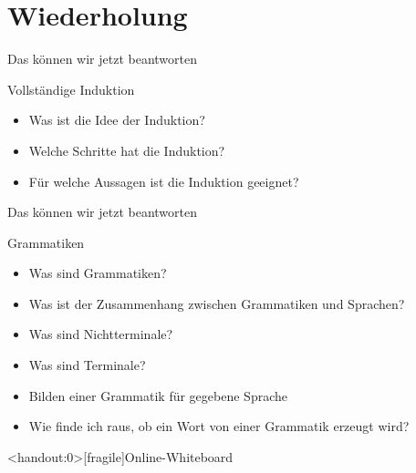 

\section{Wiederholung}
\begin{frame}[fragile]{Das können wir jetzt beantworten}
	\begin{alertblock}{Vollständige Induktion}
		\begin{itemize}
			\item Was ist die Idee der Induktion?
			\item Welche Schritte hat die Induktion? %
			\item Für welche Aussagen ist die Induktion geeignet?
		\end{itemize}
	\end{alertblock}
\end{frame}

\begin{frame}[fragile]{Das können wir jetzt beantworten}
	\begin{alertblock}{Grammatiken}
		\begin{itemize}
        	\item Was sind Grammatiken?
			\item Was ist der Zusammenhang zwischen Grammatiken und Sprachen?
			\item Was sind Nichtterminale?
			\item Was sind Terminale?
			\item Bilden einer Grammatik für gegebene Sprache
        	\item Wie finde ich raus, ob ein Wort von einer Grammatik erzeugt wird?
		\end{itemize}
	\end{alertblock}
\end{frame}




\appendix

\begin{frame}<handout:0>[fragile]{Online-Whiteboard}
	\phantom{text}
\end{frame}


